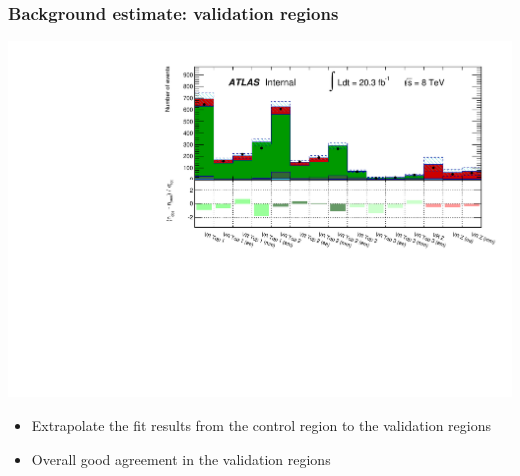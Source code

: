 \documentclass[10pt, svgnames]{beamer}
\begin{document}
\begin{frame}
  \frametitle{Background estimate: validation regions}
  \includegraphics[width=\textwidth]{figures/histpull_VR_detailed.pdf}
  \begin{itemize}
    \item Extrapolate the fit results from the control region to the validation
      regions
    \item Overall good agreement in the validation regions
  \end{itemize}
\end{frame}
\end{document}
